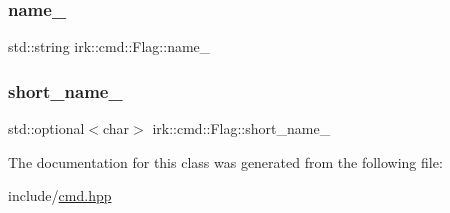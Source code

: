 \subsubsection{\texorpdfstring{name\+\_\+}{name\_}}
{\footnotesize\ttfamily std\+::string irk\+::cmd\+::\+Flag\+::name\+\_\+\hspace{0.3cm}{\ttfamily [protected]}}

\mbox{\label{classirk_1_1cmd_1_1Flag_a0b7a506b5ad1630cd78582c2dfcd4445}} 
\subsubsection{\texorpdfstring{short\+\_\+name\+\_\+}{short\_name\_}}
{\footnotesize\ttfamily std\+::optional$<$char$>$ irk\+::cmd\+::\+Flag\+::short\+\_\+name\+\_\+\hspace{0.3cm}{\ttfamily [protected]}}



The documentation for this class was generated from the following file\+:\begin{DoxyCompactItemize}
\item 
include/\mbox{\hyperlink{cmd_8hpp}{cmd.\+hpp}}\end{DoxyCompactItemize}
